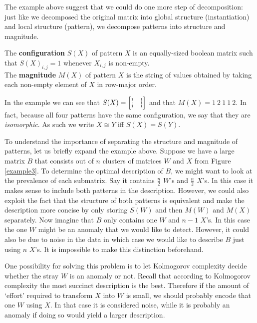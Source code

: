 \documentclass[a4paper,notoc,oneside]{tufte-book}
\begin{document}
\begin{marginfigure}

\label{example3}
\end{marginfigure}

The example above suggest that we could do one more step of decomposition: just like we decomposed the original matrix into global structure (instantiation) and local structure (pattern), we decompose patterns into structure and magnitude. 

\begin{definition}
The \textbf{configuration} $S(X)$ of pattern $X$ is an equally-sized boolean matrix such that $S(X)_{i,j}=1$ whenever $X_{i,j}$ is non-empty.\\
The \textbf{magnitude} $M(X)$ of pattern $X$ is the string of values obtained by taking each non-empty element of $X$ in row-major order.
\end{definition}

In the example we can see that $S(X)= \tiny\begin{bmatrix}1 & 1 \\[-.2em]\cdot & 1 \\[-.2em]1 & 1\end{bmatrix}$ and that $M(X)=1\ 2\ 1\ 1\ 2$. In fact, because all four patterns have the same configuration, we say that they are \emph{isomorphic}. As such we write $X \cong Y$ iff $S(X) = S(Y)$. 

To understand the importance of separating the structure and magnitude of patterns, let us briefly expand the example above. Suppose we have a large matrix $B$ that consists out of $n$ clusters of matrices $W$ and $X$ from Figure \ref{example3}. To determine the optimal description of $B$, we might want to look at the prevalence of each submatrix. Say it contains $\frac{n}{2}$ $W$'s and $\frac{n}{2}$ $X$'s. In this case it makes sense to include both patterns in the description. However, we could also exploit the fact that the structure of both patterns is equivalent and make the description more concise by only storing $S(W)$ and then $M(W)$ and $M(X)$ separately. Now imagine that $B$ only contains one $W$ and $n-1$ $X$'s. In this case the one $W$ might be an anomaly that we would like to detect. However, it could also be due to noise in the data in which case we would like to describe $B$ just using $n$ $X$'s. It is impossible to make this distinction beforehand. 

One possibility for solving this problem is to let Kolmogorov complexity decide whether the stray $W$ is an anomaly or not. Recall that according to Kolmogorov complexity the most succinct description is the best. Therefore if the amount of `effort' required to transform $X$ into $W$ is small, we should probably encode that one $W$ using $X$. In that case it is considered noise, while it is probably an anomaly if doing so would yield a larger description.
\end{document}
